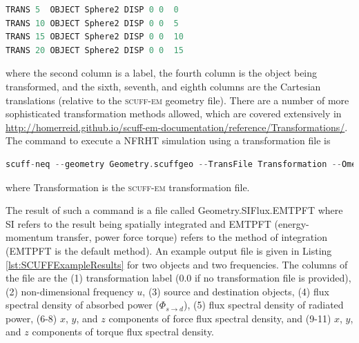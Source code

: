 \singlespacing
\begin{lstlisting}[language=Perl, caption={\textsc{scuff-em} transformation file.}, label={lst:SCUFFTransformation}]
TRANS 5  OBJECT Sphere2 DISP 0 0  0
TRANS 10 OBJECT Sphere2 DISP 0 0  5
TRANS 15 OBJECT Sphere2 DISP 0 0  10
TRANS 20 OBJECT Sphere2 DISP 0 0  15
\end{lstlisting}
\doublespacing
%
where the second column is a label, the fourth column is the object being transformed, and the sixth, seventh, and eighth columns are the Cartesian translations (relative to the \textsc{scuff-em} geometry file). There are a number of more sophisticated transformation methods allowed, which are covered extensively in \url{http://homerreid.github.io/scuff-em-documentation/reference/Transformations/}. The command to execute a NFRHT simulation using a transformation file is

\singlespacing
\begin{lstlisting}[language=C++]
scuff-neq --geometry Geometry.scuffgeo --TransFile Transformation --OmegaFile OmegaFile
\end{lstlisting}
\doublespacing
%
where Transformation is the \textsc{scuff-em} transformation file.

The result of such a command is a file called Geometry.SIFlux.EMTPFT where SI refers to the result being spatially integrated and EMTPFT (energy-momentum transfer, power force torque) refers to the method of integration (EMTPFT is the default method). An example output file is given in Listing \ref{lst:SCUFFExampleResults} for two objects and two frequencies. The columns of the file are the (1) transformation label (0.0 if no transformation file is provided), (2) non-dimensional frequency $u$, (3) source and destination objects, (4) flux spectral density of absorbed power ($\Phi_{s \rightarrow d}$), (5) flux spectral density of radiated power, (6-8) $x$, $y$, and $z$ components of force flux spectral density, and (9-11) $x$, $y$, and $z$ components of torque flux spectral density.

